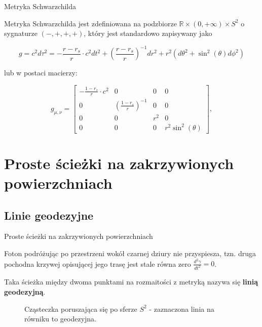 \documentclass[polish, 9pt, xcolor=table, hyperref={pdfpagemode=FullScreen}]{beamer}
\newcommand{\R}{\mathbb{R}}
\begin{document}
\begin{frame}{Metryka Schwarzchilda}

Metryka Schwarzchilda jest zdefiniowana na podzbiorze $\R \times (0, +\infty) \times S^2$ o sygnaturze $(-, +, +, +)$, który jest standardowo zapisywany jako

$$ g = c^2 d \tau^2 = -\frac{r - r_s}{r}\cdot c^2d t^2 + \left( \frac{r - r_s}{r}\right)^{-1} d r^2 + r^2(d \theta^2 + \sin^2(\theta) d \phi^2) $$

lub w postaci macierzy:

$$
g_{\mu, \nu} = \begin{bmatrix}
  -\frac{1 - r_s}{r}\cdot c^2 & 0                               & 0   & 0 \\
  0                 & \left(\frac{1 - r_s}{r}\right)^{-1} & 0   & 0 \\
  0                 & 0                                   & r^2 & 0 \\ 
  0                 & 0                                   & 0   & r^2 \sin^2(\theta)
\end{bmatrix}, 
$$

\end{frame}

\section{Proste ścieżki na zakrzywionych powierzchniach}

\subsection{Linie geodezyjne}

\begin{frame}{Proste ścieżki na zakrzywionych powierzchniach}

Foton podróżując po przestrzeni wokół czarnej dziury nie przyspiesza, tzn. druga pochodna krzywej opisującej jego trasę jest stale równa zero $\frac{d^2 \gamma} {d t^2}=0$. 

Taka ścieżka między dwoma punktami na rozmaitości z metryką nazywa się \textbf{linią geodezyjną}.

\renewcommand{\figurename}{Rysunek}
\begin{figure}
  \centering 
  \vspace{1cm}
  \caption{Cząsteczka poruszająca się po sferze $S^2$ - zaznaczona linia na równiku to geodezyjna.}\label{czasteczka po sferze}
  \vspace{1cm}
\end{figure}

\end{frame}
\end{document}
